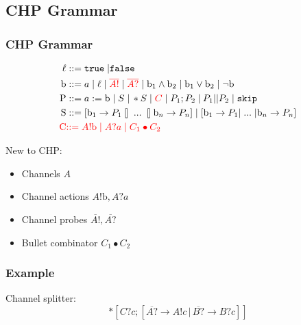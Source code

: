 \documentclass[compress]{beamer}
\begin{document}
\subsection{CHP Grammar}
\begin{frame}
    \frametitle{CHP Grammar}
    \begin{align*}
        \ell & ::= \mathtt{true} \; | \mathtt{false} \\
        \mathrm{b} & ::= a \; | \; \ell \; | \; {\color{red} \overline{A!}} \; | \; {\color{red} \overline{A?}} \; | \; \mathrm{b}_1 \wedge \mathrm{b}_2 \; | \; \mathrm{b}_1 \vee \mathrm{b}_2 \; | \; \lnot \mathrm{b} \\
        \mathrm{P} & ::= a := \mathrm{b} \; | \; S \; | \, *S \; | \; {\color{red} C} \; | \; P_1; P_2 \; | \: P_1 || P_2 \; | \; \mathtt{skip} \\
        \mathrm{S} & ::= [ \mathrm{b}_1 \rightarrow P_1 \talloblong \; ... \; \talloblong \mathrm{b}_n \rightarrow P_n ] \; | \; [ \mathrm{b}_1 \rightarrow P_1 | \; ... \; | \mathrm{b}_n \rightarrow P_n ] \\
        {\color{red} \mathrm{C}} & {\color{red} ::= A!\mathrm{b} \; | \; A?a \; | \; C_1 \bullet C_2}
    \end{align*}
\end{frame}
\begin{frame}
    New to CHP:
    \begin{itemize}
        \item Channels $A$
        \item Channel actions $A!\mathrm{b}, A?a$
        \item Channel probes $\overline{A!}, \overline{A?}$
        \item \color{lightgray} Bullet combinator $C_1 \bullet C_2$
    \end{itemize}
\end{frame}
\begin{frame}
    \frametitle{Example}
    Channel splitter:
    {\small $$*[C?c; [\overline{A?} \rightarrow A!c \, | \, \overline{B?} \rightarrow B?c]]$$}
\end{frame}
\end{document}
